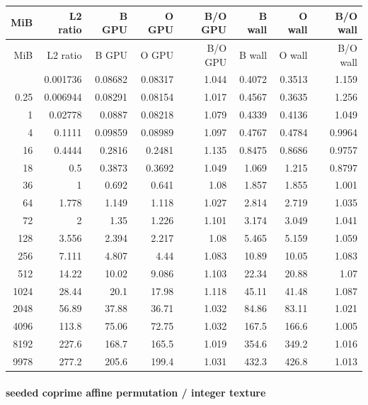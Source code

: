 \begingroup
\scriptsize
\setlength{\tabcolsep}{2.5pt}
\renewcommand{\arraystretch}{1.16}
\begin{longtable}{rrrrrrrr}
\toprule
MiB & L2 ratio & B GPU & O GPU & B/O GPU & B wall & O wall & B/O wall \\
\midrule\endfirsthead
\toprule
MiB & L2 ratio & B GPU & O GPU & B/O GPU & B wall & O wall & B/O wall \\
\midrule\endhead
\bottomrule\endfoot
0.0625 & 0.001736 & 0.08682 & 0.08317 & 1.044 & 0.4072 & 0.3513 & 1.159 \\
0.25 & 0.006944 & 0.08291 & 0.08154 & 1.017 & 0.4567 & 0.3635 & 1.256 \\
1 & 0.02778 & 0.0887 & 0.08218 & 1.079 & 0.4339 & 0.4136 & 1.049 \\
4 & 0.1111 & 0.09859 & 0.08989 & 1.097 & 0.4767 & 0.4784 & 0.9964 \\
16 & 0.4444 & 0.2816 & 0.2481 & 1.135 & 0.8475 & 0.8686 & 0.9757 \\
18 & 0.5 & 0.3873 & 0.3692 & 1.049 & 1.069 & 1.215 & 0.8797 \\
36 & 1 & 0.692 & 0.641 & 1.08 & 1.857 & 1.855 & 1.001 \\
64 & 1.778 & 1.149 & 1.118 & 1.027 & 2.814 & 2.719 & 1.035 \\
72 & 2 & 1.35 & 1.226 & 1.101 & 3.174 & 3.049 & 1.041 \\
128 & 3.556 & 2.394 & 2.217 & 1.08 & 5.465 & 5.159 & 1.059 \\
256 & 7.111 & 4.807 & 4.44 & 1.083 & 10.89 & 10.05 & 1.083 \\
512 & 14.22 & 10.02 & 9.086 & 1.103 & 22.34 & 20.88 & 1.07 \\
1024 & 28.44 & 20.1 & 17.98 & 1.118 & 45.11 & 41.48 & 1.087 \\
2048 & 56.89 & 37.88 & 36.71 & 1.032 & 84.86 & 83.11 & 1.021 \\
4096 & 113.8 & 75.06 & 72.75 & 1.032 & 167.5 & 166.6 & 1.005 \\
8192 & 227.6 & 168.7 & 165.5 & 1.019 & 354.6 & 349.2 & 1.016 \\
9978 & 277.2 & 205.6 & 199.4 & 1.031 & 432.3 & 426.8 & 1.013 \\
\end{longtable}
\endgroup


\paragraph{seeded coprime affine permutation / integer texture}

